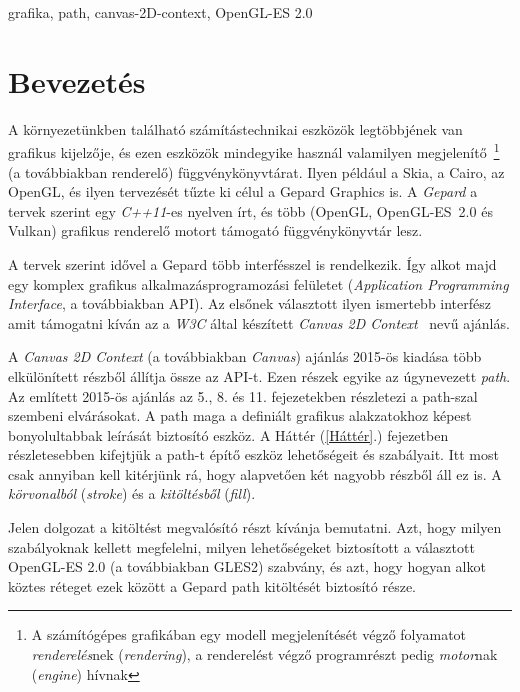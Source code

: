 \documentclass[12pt]{report}
\theoremstyle{definition}
\newcommand{\angol}[1]{\textsl{#1}}
\newcommand{\angolfn}[1]{\footnotesize{\angol{#1}}}
\begin{document}
grafika, path, canvas-2D-context, OpenGL-ES 2.0



    \chapter*{Bevezetés}
    \label{Bevezetés}

  A környezetünkben található számítástechnikai eszközök
legtöbbjének van grafikus kijelzője, és ezen eszközök mindegyike
használ valamilyen megjelenítő~\footnote{A számítógépes grafikában egy
modell megjelenítését végző folyamatot \emph{renderelés}nek
(\angolfn{rendering}), a renderelést végző programrészt pedig
\emph{motor}nak (\angolfn{engine}) hívnak} (a továbbiakban renderelő)
függvénykönyvtárat. Ilyen például a Skia, a Cairo, az OpenGL, és ilyen
tervezését tűzte ki célul a Gepard Graphics is. A \emph{Gepard} a
tervek szerint egy \emph{C++11}-es nyelven írt, és több (OpenGL,
\mbox{OpenGL-ES 2.0\cite{Munshi:2008:OEP:1481069}} és Vulkan) grafikus
renderelő motort támogató függvénykönyvtár lesz.

  A tervek szerint idővel a Gepard több interfésszel is rendelkezik.
Így alkot majd egy komplex grafikus alkalmazásprogramozási felületet
(\angol{Application Programming Interface}, a továbbiakban API). Az
elsőnek választott ilyen ismertebb interfész amit támogatni kíván az a
\emph{W3C} által készített \emph{Canvas 2D
Context}~\cite{Cabanier:14:HCC} nevű ajánlás.

  A \emph{Canvas 2D Context} (a továbbiakban \emph{Canvas}) ajánlás
2015-ös kiadása több elkülönített részből állítja össze az API-t. Ezen
részek egyike az úgynevezett \emph{path}. Az említett 2015-ös ajánlás
az 5., 8. és 11. fejezetekben részletezi a path-szal szembeni
elvárásokat. A path maga a definiált grafikus alakzatokhoz képest
bonyolultabbak leírását biztosító eszköz. A Háttér (\ref{Háttér}.)
fejezetben részletesebben kifejtjük a path-t építő eszköz lehetőségeit
és szabályait. Itt most csak annyiban kell kitérjünk rá, hogy
alapvetően két nagyobb részből áll ez is. A \emph{körvonalból}
(\angol{stroke}) és a \emph{kitöltésből} (\angol{fill}).

  Jelen dolgozat a kitöltést megvalósító részt kívánja bemutatni.
Azt, hogy milyen szabályoknak kellett megfelelni, milyen lehetőségeket
biztosított a választott OpenGL-ES 2.0 (a továbbiakban GLES2) szabvány,
és azt, hogy hogyan alkot köztes réteget ezek között a Gepard path
kitöltését biztosító része.
\end{document}
